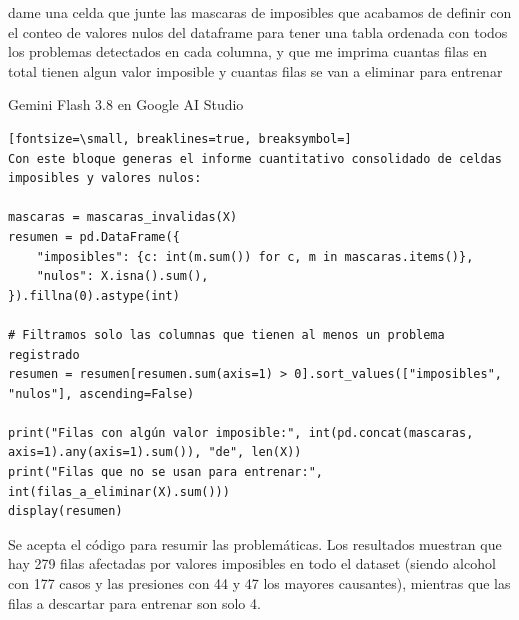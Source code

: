 \documentclass[12pt,a4paper,oneside]{book}
\begin{document}
\begin{iaprompt}
dame una celda que junte las mascaras de imposibles que acabamos de definir con el conteo de valores nulos del dataframe para tener una tabla ordenada con todos los problemas detectados en cada columna, y que me imprima cuantas filas en total tienen algun valor imposible y cuantas filas se van a eliminar para entrenar
\end{iaprompt}
\begin{iaresp}{Gemini Flash 3.8 en Google AI Studio}
\begin{Verbatim}[fontsize=\small, breaklines=true, breaksymbol=]
Con este bloque generas el informe cuantitativo consolidado de celdas imposibles y valores nulos:

mascaras = mascaras_invalidas(X)
resumen = pd.DataFrame({
    "imposibles": {c: int(m.sum()) for c, m in mascaras.items()},
    "nulos": X.isna().sum(),
}).fillna(0).astype(int)

# Filtramos solo las columnas que tienen al menos un problema registrado
resumen = resumen[resumen.sum(axis=1) > 0].sort_values(["imposibles", "nulos"], ascending=False)

print("Filas con algún valor imposible:", int(pd.concat(mascaras, axis=1).any(axis=1).sum()), "de", len(X))
print("Filas que no se usan para entrenar:", int(filas_a_eliminar(X).sum()))
display(resumen)
\end{Verbatim}
\end{iaresp}
\begin{iaanalisis}
Se acepta el código para resumir las problemáticas. Los resultados muestran que hay 279 filas afectadas por valores imposibles en todo el dataset (siendo alcohol con 177 casos y las presiones con 44 y 47 los mayores causantes), mientras que las filas a descartar para entrenar son solo 4.
\end{iaanalisis}
\end{document}

